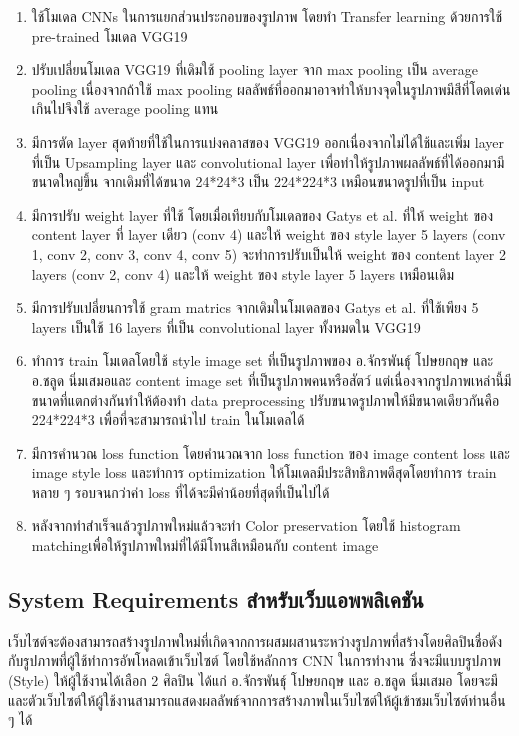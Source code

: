 \documentclass[12pt,oneside,openright,a4paper]{cpe-thai-project}
\begin{document}
\begin{enumerate}
  \item ใช้โมเดล CNNs ในการแยกส่วนประกอบของรูปภาพ โดยทำ Transfer learning ด้วยการใช้ pre-trained โมเดล VGG19 
  \item ปรับเปลี่ยนโมเดล VGG19 ที่เดิมใช้ pooling layer จาก max pooling เป็น average pooling เนื่องจากถ้าใช้ max pooling ผลลัพธ์ที่ออกมาอาจทำให้บางจุดในรูปภาพมีสีที่โดดเด่นเกินไปจึงใช้  average pooling แทน
  \item มีการตัด layer สุดท้ายที่ใช้ในการแบ่งคลาสของ VGG19 ออกเนื่องจากไม่ได้ใช้และเพิ่ม layer ที่เป็น Upsampling layer และ convolutional layer เพื่อทำให้รูปภาพผลลัพธ์ที่ได้ออกมามีขนาดใหญ่ขึ้น จากเดิมที่ได้ขนาด 24*24*3 เป็น 224*224*3 เหมือนขนาดรูปที่เป็น input
  \item มีการปรับ weight layer ที่ใช้ โดยเมื่อเทียบกับโมเดลของ Gatys  et al. \cite{gatys2015neural} ที่ให้ weight ของ content layer ที่ layer เดียว (conv 4) และให้ weight ของ style layer 5 layers (conv 1, conv 2, conv 3, conv 4, conv 5) จะทำการปรับเป็นให้ weight ของ content layer 2 layers (conv 2, conv 4) และให้ weight ของ style layer 5 layers เหมือนเดิม 
  \item มีการปรับเปลี่ยนการใช้ gram matrics จากเดิมในโมเดลของ Gatys  et al. \cite{gatys2015neural} ที่ใช้เพียง 5 layers เป็นใช้ 16 layers ที่เป็น convolutional layer ทั้งหมดใน VGG19
  \item ทำการ train โมเดลโดยใช้ style image set ที่เป็นรูปภาพของ อ.จักรพันธุ์ โปษยกฤษ และ อ.ชลูด นิ่มเสมอและ content image set ที่เป็นรูปภาพคนหรือสัตว์ แต่เนื่องจากรูปภาพเหล่านี้มีขนาดที่แตกต่างกันทำให้ต้องทำ data preprocessing ปรับขนาดรูปภาพให้มีขนาดเดียวกันคือ 224*224*3 เพื่อที่จะสามารถนำไป train ในโมเดลได้
  \item มีการคำนวณ loss function โดยคำนวณจาก loss function ของ image content loss และ image style loss และทำการ optimization ให้โมเดลมีประสิทธิภาพดีสุดโดยทำการ train หลาย ๆ รอบจนกว่าค่า loss ที่ได้จะมีค่าน้อยที่สุดที่เป็นไปได้
  \item หลังจากทำสำเร็จแล้วรูปภาพใหม่แล้วจะทำ Color preservation โดยใช้ histogram matchingเพื่อให้รูปภาพใหม่ที่ได้มีโทนสีเหมือนกับ content image
\end{enumerate}


\subsection{System Requirements สำหรับเว็บแอพพลิเคชัน}
\par\setlength{\parindent}{5ex}
เว็บไซต์จะต้องสามารถสร้างรูปภาพใหม่ที่เกิดจากการผสมผสานระหว่างรูปภาพที่สร้างโดยศิลปินชื่อดังกับรูปภาพที่ผู้ใช้ทำการอัพโหลดเข้าเว็บไซต์ โดยใช้หลักการ CNN ในการทำงาน ซึ่งจะมีแบบรูปภาพ (Style) ให้ผู้ใช้งานได้เลือก 2 ศิลปิน ได้แก่ อ.จักรพันธุ์ โปษยกฤษ และ อ.ชลูด นิ่มเสมอ โดยจะมี และตัวเว็บไซต์ให้ผู้ใช้งานสามารถแสดงผลลัพธ์จากการสร้างภาพในเว็บไซต์ให้ผู้เข้าชมเว็บไซต์ท่านอื่น ๆ ได้ 
\end{document}

